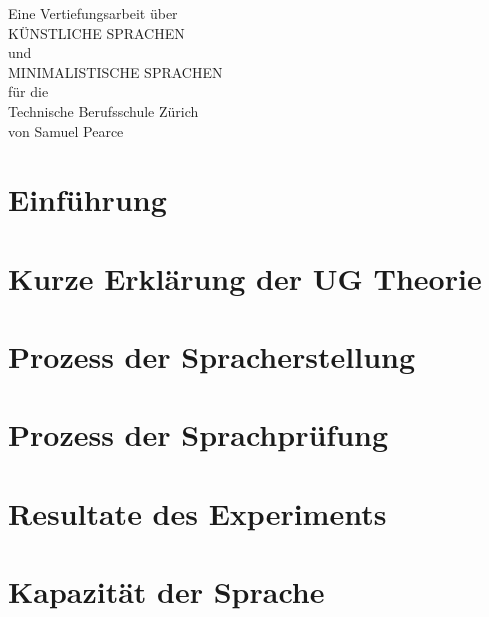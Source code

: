 \documentclass{article}
\begin{document}
%

\begingroup
\centering
\vfill
\Large{Eine Vertiefungsarbeit über}\\
\Huge{KÜNSTLICHE SPRACHEN}\\
\huge{und}\\
\huge{MINIMALISTISCHE SPRACHEN}\\
\large{für die}\\
\Large{Technische Berufsschule Zürich}\\
\vspace{3cm}
\Large{von Samuel Pearce}\\
\vfill\null
\endgroup
\thispagestyle{empty}

\tableofcontents
\pagebreak

%
% 

\section{Einführung}
\cite{Stevens72}



\section{Kurze Erklärung der UG Theorie}



\section{Prozess der Spracherstellung}


\section{Prozess der Sprachprüfung}


\section{Resultate des Experiments}



\section{Kapazität der Sprache }




\end{document}
